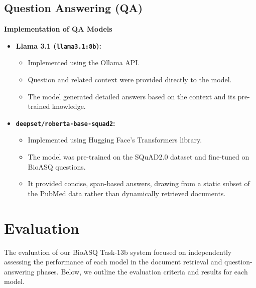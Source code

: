 \documentclass{article}
\begin{document}
\subsection{Question Answering (QA)}
\textbf{Implementation of QA Models}
    \begin{itemize}
        \item \textbf{Llama 3.1 (\texttt{llama3.1:8b}):}
        \begin{itemize}
            \item Implemented using the Ollama API.
            \item Question and related context were provided directly to the model.
            \item The model generated detailed answers based on the context and its pre-trained knowledge.
        \end{itemize}
        \item \textbf{\texttt{deepset/roberta-base-squad2}:}
        \begin{itemize}
            \item Implemented using Hugging Face's Transformers library.
            \item The model was pre-trained on the SQuAD2.0 dataset and fine-tuned on BioASQ questions.
            \item It provided concise, span-based answers, drawing from a static subset of the PubMed data rather than dynamically retrieved documents.
        \end{itemize}
    \end{itemize}

\section{Evaluation}
The evaluation of our BioASQ Task-13b system focused on independently assessing the performance of each model in the document retrieval and question-answering phases. Below, we outline the evaluation criteria and results for each model.
\end{document}
